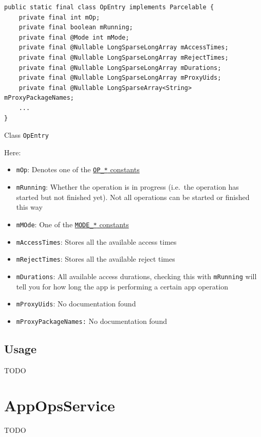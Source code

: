 \begin{listing}[H]
    \begin{verbatim}
public static final class OpEntry implements Parcelable {
    private final int mOp;
    private final boolean mRunning;
    private final @Mode int mMode;
    private final @Nullable LongSparseLongArray mAccessTimes;
    private final @Nullable LongSparseLongArray mRejectTimes;
    private final @Nullable LongSparseLongArray mDurations;
    private final @Nullable LongSparseLongArray mProxyUids;
    private final @Nullable LongSparseArray<String> mProxyPackageNames;
    ...
}
    \end{verbatim}
    \caption{Class \texttt{OpEntry}} %
    \label{lst:class-op-entry}
\end{listing}
Here:
\begin{itemize}
    \item \texttt{mOp}: Denotes one of the \hyperref[subsec:op-constants]{\texttt{OP\_*} constants}
    \item \texttt{mRunning}: Whether the operation is in progress (i.e.\ the operation has started but not finished
    yet). Not all operations can be started or finished this way
    \item \texttt{mMOde}: One of the \hyperref[subsec:mode-constants]{\texttt{MODE\_*} constants}
    \item \texttt{mAccessTimes}: Stores all the available access times
    \item \texttt{mRejectTimes}: Stores all the available reject times
    \item \texttt{mDurations}: All available access durations, checking this with \texttt{mRunning} will tell you for
    how long the app is performing a certain app operation
    \item \texttt{mProxyUids}: No documentation found
    \item \texttt{mProxyPackageNames:} No documentation found
\end{itemize}

\subsection{Usage}\label{subsec:usage} %
TODO

\section{AppOpsService}\label{sec:appopsservice} %
TODO


